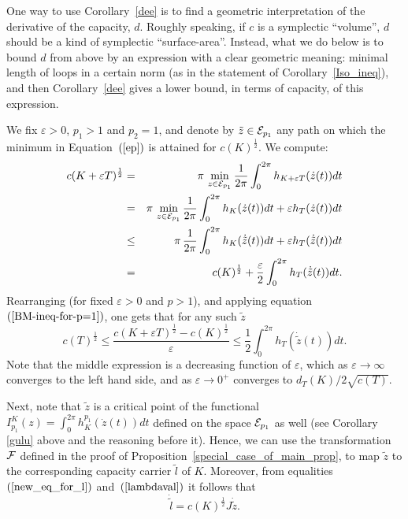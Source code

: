 \documentclass[12pt]{article}
\def\eps{\varepsilon}
\begin{document}
One way to use Corollary~\ref{dee} is to find a geometric
interpretation of the derivative of the capacity, $d$. Roughly
speaking, if $c$ is a symplectic ``volume'', $d$ should be a kind of
symplectic ``surface-area''. Instead, what we do below is to bound
$d$ from above by an expression with a clear geometric meaning:
minimal length of loops in a certain norm (as in the statement of
Corollary~\ref{Iso_ineq}), and then Corollary~\ref{dee} gives a
lower bound, in terms of capacity, of this expression.

We fix $\eps > 0$, $p_1 > 1$ and $p_2=1$, and denote by $\tilde{z}
\in {\cal E}_{p_1}$ any path on which the minimum in
Equation~$(\ref{ep})$ is attained for $c(K)^{\frac 1 2}$. We
compute:
\begin{eqnarray*}
c(K+ \eps T)^{\frac 1 2} &=&   \pi \, \min_{z \in {\cal E}_{p_1}}
{\frac 1 {2\pi}} \int_0^{2 \pi} h_{K+\eps T}(\dot{z}(t))dt \\
&=& \pi \, \min_{z \in {\cal E}_{p_1}} {\frac 1 {2\pi}} \int_0^{2
\pi} h_K(\dot{z}(t))dt + \eps h_T(\dot{z}(t))dt  \\
&\le & \pi \, {\frac 1 {2\pi}} \int_0^{2
\pi} h_K(\dot{\tilde{z}}(t))dt + \eps h_T(\dot{\tilde{z}}(t))dt  \\
&= & c(K)^{\frac 1 2} + {\frac \eps {2}} \int_0^{2 \pi}
h_T(\dot{\tilde{z}}(t))dt.
\end{eqnarray*}
Rearranging (for fixed $\eps>0$ and $p>1$), and applying
equation~$(\ref{BM-ineq-for-p=1})$, one gets that for any such $\tilde{z}$
\[ c(T)^{\frac 1 2} \leq  {\frac{c(K+\eps T)^{\frac 1 2}-c(K)^{\frac 1
2}}{\eps}} \le {\frac 1 2} \int_0^{2 \pi}
h_T(\dot{\tilde{z}}(t))dt.\]
%
Note that the middle expression is a decreasing function of $\eps$,
which as $\eps\to \infty$ converges to the left hand side, and as
$\eps \to 0^+$ converges to $d_T(K)/2\sqrt{c(T)}$.



Next, note that ${\tilde z}$ is a critical point of the functional
$I_{p_1}^K(z) = \int_0^{2\pi} h_K^{p_1}({\dot z}(t))dt$ defined on
the space ${\cal E}_{p_1}$ as well (see Corollary \ref{gulu} above
and the reasoning before it). Hence, we can use the transformation
${\cal F}$ defined in the proof of
Proposition~\ref{special_case_of_main_prop}, to map ${\tilde z}$ to
the corresponding
 capacity carrier $\tilde l$ of $K$. Moreover, from
 equalities~$(\ref{new_eq_for_l})$
 and~$(\ref{lambdaval})$ it follows that
$$ {\dot {\tilde l}} = c(K)^{\frac 1 2} J {\dot {\tilde z}}.$$
\end{document}
